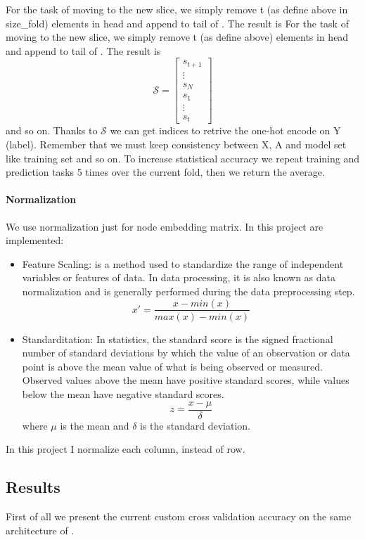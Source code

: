 \documentclass{report}
\begin{document}
For the task of moving to the new slice, we simply remove t (as define above in size\_fold) elements in head and append to tail of . The result is 
For the task of moving to the new slice, we simply remove t (as define above) elements in head and append to tail of . The result is 
\[
\mathcal{S} =
 \begin{bmatrix}
           s_{t+1} \\        
           \vdots \\
           s_{N}\\
           s_{1}\\
			\vdots \\		
           s_{t}
           \end{bmatrix}
\]
and so on. Thanks to $\mathcal{S}$ we can get indices to retrive the one-hot encode on Y (label). Remember that we must keep consistency between X, A and model set like training set and so on.
To increase statistical accuracy we repeat training and prediction tasks 5 times over the current fold, then we return the average. 
\paragraph{Normalization}
We use normalization just for node embedding matrix.
In this project are implemented:
\begin{itemize}
\item Feature Scaling: is a method used to standardize the range of independent variables or features of data. In data processing, it is also known as data normalization and is generally performed during the data preprocessing step.
\[
x' = \dfrac{x - min(x)}{max(x)-min(x)}
\]
\item Standarditation:
In statistics, the standard score is the signed fractional number of standard deviations by which the value of an observation or data point is above the mean value of what is being observed or measured. Observed values above the mean have positive standard scores, while values below the mean have negative standard scores.
\[
z = \dfrac{x- \mu }{\delta}
\]
where $\mu$ is the mean and $\delta$ is the standard deviation.
\end{itemize}
In this project I normalize each column, instead of row.

\subsection{Results}
First of all we present the current custom cross validation accuracy on the same architecture of \cite{Kipf_GCN}.
\end{document}
